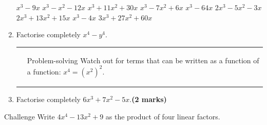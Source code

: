 \documentclass[fleqn]{article}
\begin{document}
\begin{enumerate}
\begin{tasks}
			\task $x^3-9x$			%
			\task $x^3-x^2-12x$		%
			\task $x^3+11x^2+30x$	%
			\task $x^3-7x^2+6x$		%
			\task $x^3-64x$			%
			\task $2x^3-5x^2-3x$		%
			\task $2x^3+13x^2+15x$	%
			\task $x^3-4x$			%
			\task $3x^3+27x^2+60x$	%
		\end{tasks}
	\item Factorise completely $x^4-y^4$. %
		\begin{table}[!ht]
			\begin{tabularx}{\dimexpr\textwidth}{X@{\hskip10pt}p{3.5in}}
				{ } & \vspace{-1.6cm}\begin{mybox2}[colbacktitle=green]{Problem-solving}
						Watch out for terms that can be written as a function of a function: $x^4=(x^2)^2$.
				\end{mybox2}
		    \end{tabularx}
		    \vspace{-10mm}
		\end{table}
	\item Factorise completely $6x^3+7x^2-5x$.\hfill \textbf{(2 marks)} %
\end{enumerate}
\begin{mybox2}[]{Challenge}
	\rmfamily Write $4x^4-13x^2+9$ as the product of four linear factors.
\end{mybox2}
\end{document}
